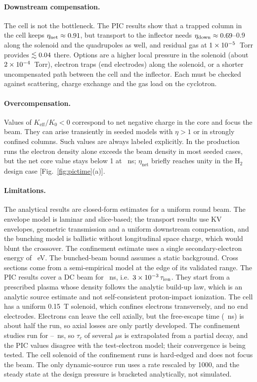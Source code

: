 \documentclass[aps,prab,10pt,twocolumn,superscriptaddress,showpacs,floatfix]{revtex4-2}
\newcommand{\Keff}{K_{\mathrm{eff}}}
\newcommand{\Htwo}{\mathrm{H}_2}
\begin{document}
\paragraph{Downstream compensation.}
The cell is not the bottleneck. The PIC results show that a trapped column in the cell keeps
$\eta_{\mathrm{net}}\approx0.91$, but transport to the inflector needs
$\eta_{\mathrm{down}}\approx0.69$--0.9 along the solenoid and the
quadrupoles as well, and residual gas at $1\times10^{-5}$~Torr provides
$\lesssim0.04$ there. Options are a higher local pressure in the solenoid
(about $2\times10^{-4}$~Torr), electron traps (end electrodes) along the solenoid, or a
shorter uncompensated path between the cell and the inflector. Each must be checked against
scattering, charge exchange and the gas load on the cyclotron.

\paragraph{Overcompensation.}
Values of $\Keff/K_0<0$ correspond to net negative charge in the core and focus the
beam. They can arise transiently in seeded models with $\eta>1$ or in strongly confined
columns. Such values are always labeled explicitly. In the production runs the electron
density alone exceeds the beam density in most seeded cases, but the net core value stays
below 1 at \numpicns~ns; $\eta_{\mathrm{net}}$ briefly reaches unity in the
$\Htwo$ design case [Fig.~\ref{fig:pictime}(a)].

\paragraph{Limitations.}
The analytical results are closed-form estimates for a uniform round beam. The envelope
model is laminar and slice-based; the transport results use KV envelopes, geometric
transmission and a uniform downstream compensation, and the bunching model is ballistic
without longitudinal space charge, which would blunt the crossover. The confinement estimate uses a single
secondary-electron energy of \numEeev~eV. The bunched-beam bound assumes a static
background. Cross sections come from a semi-empirical model at the edge of its validated
range. The PIC results cover a DC beam for \numpicns~ns, i.e.\ $3\times10^{-3}\,\tau_{\mathrm{ion}}$.
They start from a prescribed plasma whose density follows the analytic build-up law, which
is an analytic source estimate and not self-consistent proton-impact ionization. The cell
has a uniform 0.15~T solenoid, which confines electrons transversely, and no end
electrodes. Electrons can leave the cell axially, but the free-escape time
(\numtescapens~ns) is about half the run, so axial losses are only partly developed. The
confinement studies run for \numstCOtend--\numstCWtendns~ns, so $\tau_c$ of several
$\mu$s is extrapolated from a partial decay, and the PIC values disagree with the
test-electron model; their convergence is being tested. The cell solenoid of the confinement
runs is hard-edged and does not focus the beam. The only dynamic-source run uses a rate
rescaled by 1000, and the steady state at the design pressure is bracketed analytically,
not simulated.
\end{document}

